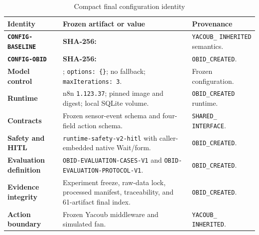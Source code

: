 \begin{table}[H]
\centering
\caption{Compact final configuration identity}
\label{tab:impl-final-identity}

\begingroup
\footnotesize
\setlength{\tabcolsep}{3.5pt}
\renewcommand{\arraystretch}{1.13}

\begin{tabularx}{\textwidth}{
  @{}
  L{0.20\textwidth}
  Y
  L{0.22\textwidth}
  @{}
}
\toprule
\textbf{Identity}
&
\textbf{Frozen artifact or value}
&
\textbf{Provenance}
\\
\midrule

\textbf{\texttt{CONFIG-}}\newline
\textbf{\texttt{BASELINE}}
&
\newline
\textbf{SHA-256:}
&
\texttt{YACOUB\_}\newline
\texttt{INHERITED} semantics.
\\
\addlinespace[2pt]

\textbf{\texttt{CONFIG-OBID}}
&
\newline
\textbf{SHA-256:}
&
\texttt{OBID\_CREATED}.
\\
\addlinespace[2pt]

\textbf{Model control}
&
;
\texttt{options: \{\}}; no fallback;
\texttt{maxIterations: 3}.
&
Frozen configuration.
\\
\addlinespace[2pt]

\textbf{Runtime}
&
n8n \texttt{1.123.37}; pinned image and digest; local SQLite volume.
&
\texttt{OBID\_CREATED} runtime.
\\
\addlinespace[2pt]

\textbf{Contracts}
&
Frozen sensor-event schema and four-field action schema.
&
\texttt{SHARED\_}\newline
\texttt{INTERFACE}.
\\
\addlinespace[2pt]

\textbf{Safety and HITL}
&
\texttt{runtime-safety-v2-hitl} with caller-embedded native Wait/form.
&
\texttt{OBID\_CREATED}.
\\
\addlinespace[2pt]

\textbf{Evaluation definition}
&
\texttt{OBID-EVALUATION-CASES-V1} and
\texttt{OBID-EVALUATION-PROTOCOL-V1}.
&
\texttt{OBID\_CREATED}.
\\
\addlinespace[2pt]

\textbf{Evidence integrity}
&
Experiment freeze, raw-data lock, processed manifest, traceability, and
61-artifact final index.
&
\texttt{OBID\_CREATED}.
\\
\addlinespace[2pt]

\textbf{Action boundary}
&
Frozen Yacoub middleware and simulated fan.
&
\texttt{YACOUB\_}\newline
\texttt{INHERITED}.
\\

\bottomrule
\end{tabularx}
\endgroup
\end{table}


